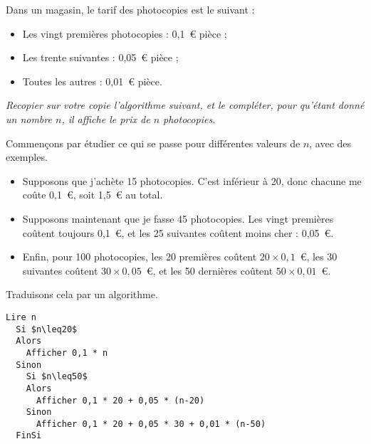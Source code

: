 \documentclass[11pt]{article}
\begin{document}
\begin{exercice}
  Dans un magasin, le tarif des photocopies est le suivant :
  \begin{itemize}[$\bullet$]
    \item Les vingt premières photocopies : 0,1~\euro{} pièce ;
    \item Les trente suivantes : 0,05~\euro{} pièce ;
    \item Toutes les autres : 0,01~\euro{} pièce.
  \end{itemize}
  \emph{
    Recopier sur votre copie l'algorithme suivant, et le compléter, pour qu'étant donné un nombre $n$, il affiche le prix de $n$ photocopies.
  }

  Commençons par étudier ce qui se passe pour différentes valeurs de $n$, avec des exemples.

  \begin{itemize}
    \item Supposons que j'achète 15 photocopies. C'est inférieur à 20, donc chacune me coûte 0,1~\euro, soit 1,5~\euro{} au total.
    \item Supposons maintenant que je fasse 45 photocopies. Les vingt premières coûtent toujours 0,1~\euro{}, et les 25 suivantes coûtent moins cher : 0,05~\euro.
    \item Enfin, pour 100 photocopies, les 20 premières coûtent $20\times0,1$~\euro{}, les 30 suivantes coûtent $30\times0,05$~\euro, et les 50 dernières coûtent $50\times0,01$~\euro.
  \end{itemize}

  Traduisons cela par un algorithme.

  \begin{lstlisting}[language=naturel,frame=lines,mathescape=true]
  Lire n
  Si $n\leq20$
  Alors
    Afficher 0,1 * n
  Sinon
    Si $n\leq50$
    Alors
      Afficher 0,1 * 20 + 0,05 * (n-20)
    Sinon
      Afficher 0,1 * 20 + 0,05 * 30 + 0,01 * (n-50)
  FinSi
  \end{lstlisting}
\end{exercice}
\end{document}
